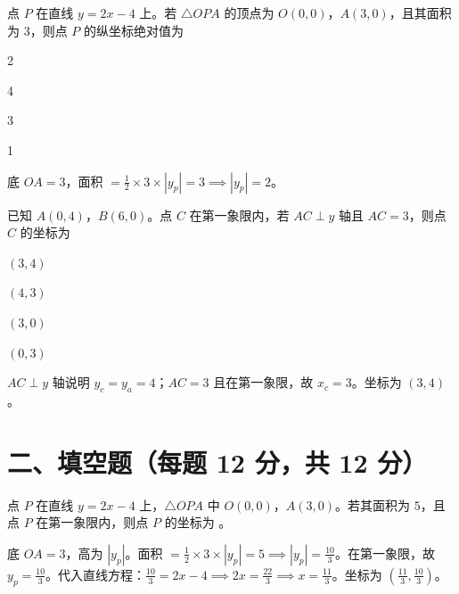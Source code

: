 \documentclass{exam-zh}
\begin{document}
\begin{question}[points=12]
  点 $P$ 在直线 $y = 2x - 4$ 上。若 $\triangle OPA$ 的顶点为 $O(0, 0)$，$A(3, 0)$，且其面积为 $3$，则点 $P$ 的纵坐标绝对值为
  \begin{choices}
    \item 2
    \item 4
    \item 3
    \item 1
  \end{choices}
  \paren[A]
  \begin{solutionblock}
    底 $OA = 3$，面积 $= \frac{1}{2} \times 3 \times |y_p| = 3 \implies |y_p| = 2$。
  \end{solutionblock}
\end{question}



\begin{question}[points=12]
  已知 $A(0, 4)$，$B(6, 0)$。点 $C$ 在第一象限内，若 $AC \perp y$ 轴且 $AC = 3$，则点 $C$ 的坐标为
  \begin{choices}
    \item $(3, 4)$
    \item $(4, 3)$
    \item $(3, 0)$
    \item $(0, 3)$
  \end{choices}
  \paren[A]
  \begin{solutionblock}
    $AC \perp y$ 轴说明 $y_c = y_a = 4$；$AC = 3$ 且在第一象限，故 $x_c = 3$。坐标为 $(3, 4)$。
  \end{solutionblock}
\end{question}


\section*{二、填空题（每题 12 分，共 12 分）}


\begin{question}[points=12]
  点 $P$ 在直线 $y = 2x - 4$ 上，$\triangle OPA$ 中 $O(0, 0)$，$A(3, 0)$。若其面积为 $5$，且点 $P$ 在第一象限内，则点 $P$ 的坐标为 \fillin。
  \begin{solutionblock}
    底 $OA = 3$，高为 $|y_p|$。面积 $= \frac{1}{2} \times 3 \times |y_p| = 5 \implies |y_p| = \frac{10}{3}$。在第一象限，故 $y_p = \frac{10}{3}$。代入直线方程：$\frac{10}{3} = 2x - 4 \implies 2x = \frac{22}{3} \implies x = \frac{11}{3}$。坐标为 $(\frac{11}{3}, \frac{10}{3})$。
  \end{solutionblock}
\end{question}
\end{document}

